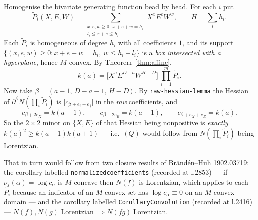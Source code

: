 \documentclass[11pt]{article}
\theoremstyle{plain}
\theoremstyle{definition}
\begin{document}
Homogenise the bivariate generating function bead by bead. For each $i$ put
\[
  \widetilde P_i(X,E,W)=\sum_{\substack{x,e,w\ge0,\ x+e+w=h_i\\ l_i\le x+e\le h_i}}X^xE^eW^w ,
  \qquad H=\sum_ih_i .
\]
Each $\widetilde P_i$ is homogeneous of degree $h_i$ with all coefficients $1$, and its
support $\{(x,e,w)\ge0:x+e+w=h_i,\ w\le h_i-l_i\}$ is a \emph{box intersected with a
hyperplane}, hence $M$-convex. By Theorem~\ref{thm:affine},
\[
  k(a)=\bigl[X^aE^{D-a}W^{H-D}\bigr]\ \prod_{i=1}^m\widetilde P_i .
\]
Now take $\beta=(a-1,\,D-a-1,\,H-D)$. By \texttt{raw-hessian-lemma} the Hessian of
$\partial^\beta N(\prod_i\widetilde P_i)$ is
$\bigl[c_{\beta+e_i+e_j}\bigr]$ in the \emph{raw} coefficients, and
\[
  c_{\beta+2e_X}=k(a+1),\qquad c_{\beta+2e_E}=k(a-1),\qquad c_{\beta+e_X+e_E}=k(a).
\]
So the $2\times2$ minor on $\{X,E\}$ of that Hessian being nonpositive is \emph{exactly}
$k(a)^2\ge k(a-1)k(a+1)$ --- i.e.\ $(Q)$ would follow from
$N(\prod_i\widetilde P_i)$ being Lorentzian.

That in turn would follow from two closure results of Brändén--Huh 1902.03719: the
corollary labelled \verb|normalizedcoefficients| (recorded at l.2853) --- if
$\nu_f(\alpha)=\log c_\alpha$ is $M$-concave then $N(f)$ is Lorentzian, which applies to
each $\widetilde P_i$ because an indicator of an $M$-convex set has $\log c_\alpha\equiv0$
on an $M$-convex domain --- and the corollary labelled \verb|CorollaryConvolution|
(recorded at l.2416) --- $N(f),N(g)$ Lorentzian $\Rightarrow N(fg)$ Lorentzian.
\end{document}
